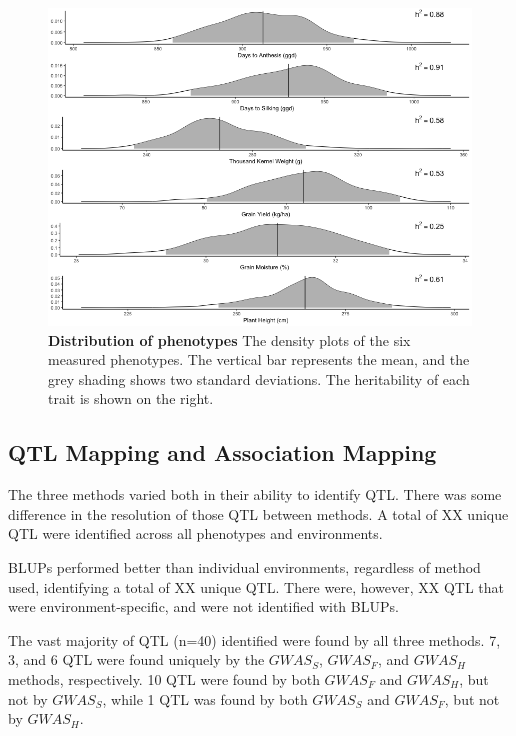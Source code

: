 \documentclass[article,9pt,twocolumn,twoside]{rilabRxiv}
\begin{document}
\begin{figure}[ht]
\centering
\includegraphics[width=\linewidth]{figures/Methods_Fig2.png}
\caption{\textbf{Distribution of phenotypes} The density plots of the six measured phenotypes. The vertical bar represents the mean, and the grey shading shows two standard deviations. The heritability of each trait is shown on the right.}
\label{fig:figure2}
\end{figure}

\subsection{QTL Mapping and Association Mapping}
The three methods varied both in their ability to identify QTL. There was some difference in the resolution of those QTL between methods.
A total of XX unique QTL were identified across all phenotypes and environments.

BLUPs performed better than individual environments, regardless of method used,
identifying a total of XX unique QTL. There were, however, XX QTL that were environment-specific, and were not identified with BLUPs.



The vast majority of QTL (n=40) identified were found by all three methods. 7, 3, and 6 QTL were found uniquely by the $GWAS_S$, $GWAS_F$, and $GWAS_H$ methods, respectively. 10 QTL were found by both $GWAS_F$ and $GWAS_H$, but not by $GWAS_S$, while 1 QTL was found by both $GWAS_S$ and $GWAS_F$, but not by $GWAS_H$.
\end{document}
